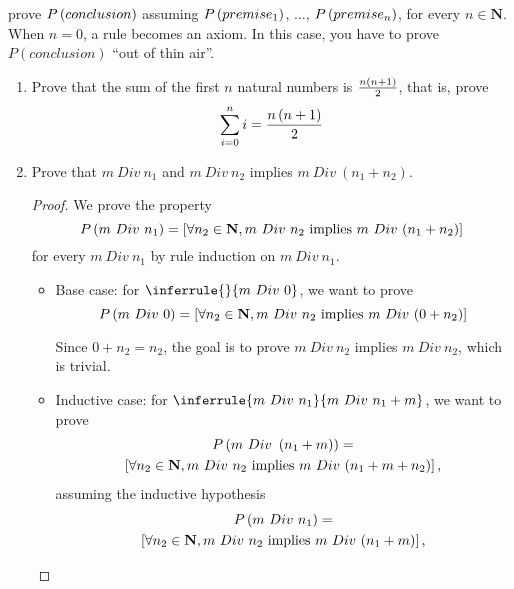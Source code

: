 \documentclass[a4paper,12pt]{article}
\newcommand{\appl}[2]{#1\inparens{#2}}
\begin{document}

\noindent
prove $\appl{P}{conclusion}$ assuming $\appl{P}{premise_1}$, $\ldots$,
$\appl{P}{premise_n}$, for every $n \in \mathbf{N}$.  When $n = 0$, a rule becomes
an axiom.  In this case, you have to prove $P(conclusion)$ ``out of thin air''.

\begin{enumerate}
 \item Prove that the sum of the first $n$ natural numbers is
  $\frac{n\left(n + 1\right)}{2}$, that is, prove
  \[ \sum_{i = 0}^{n} i = \frac{n\left(n + 1\right)}{2} \]
 \item Prove that $m\ Div\ n_1$ and $m\ Div\ n_2$ implies $m\ Div\ (n_1 + n_2)$.
  \begin{proof}
   We prove the property
   \[
     \appl{P}{m\ Div\ n_1} = \inbracks{\forall n_2 \in \mathbf{N}, m\ Div\ n_2\
     \text{implies}\ m\ Div\ (n_1 + n_2)}
   \]
   for every $m\ Div\ n_1$ by rule induction on $m\ Div\ n_1$.

   \begin{itemize}
    \item Base case: for $\inferrule{ }{m\ Div\ 0}$, we want to prove
     \[
       \appl{P}{m\ Div\ 0} = \inbracks{\forall n_2 \in \mathbf{N}, m\ Div\ n_2\
       \text{implies}\ m\ Div\ (0 + n_2)}
     \]

     Since $0 + n_2 = n_2$, the goal is to prove $m\ Div\ n_2$ implies $m\ Div\ n_2$,
     which is trivial.
    \item Inductive case: for $\inferrule{m\ Div\ n_1}{m\ Div\ n_1 + m}$, we want to
     prove
     \begin{multline*}
      \appl{P}{m\ Div\ \inparens{n_1 + m}} = \\ \inbracks{\forall n_2 \in \mathbf{N},
       m\ Div\ n_2\ \text{implies}\ m\ Div\ (n_1 + m + n_2)},
     \end{multline*}
     assuming the inductive hypothesis
     \begin{multline*}
      \appl{P}{m\ Div\ n_1} = \\ \inbracks{\forall n_2 \in \mathbf{N}, m\ Div\ n_2\
      \text{implies}\ m\ Div\ (n_1 + m)},
     \end{multline*}


\end{itemize}
\end{proof}
\end{enumerate}
\end{document}
